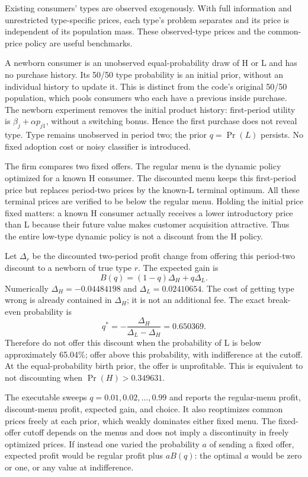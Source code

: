 \documentclass[12pt]{article}
\theoremstyle{definition}
\theoremstyle{remark}
\numberwithin{equation}{section}
\begin{document}
Existing consumers' types are observed exogenously. With full information
and unrestricted type-specific prices, each type's problem separates and its
price is independent of its population mass. These observed-type prices and
the common-price policy are useful benchmarks.

A newborn consumer is an unobserved equal-probability draw of H or L and has no
purchase history. Its 50/50 type probability is an initial prior, without an
individual history to update it. This is distinct from the code's original
50/50 population, which pools consumers who each have a previous inside
purchase. The newborn experiment removes the initial product history: first-period
utility is $\beta_j+\alpha p_{j1}$, without a switching bonus. Hence the first
purchase does not reveal type. Type remains unobserved in period two; the prior
$q=\Pr(L)$ persists. No fixed adoption cost or noisy classifier is introduced.

The firm compares two fixed offers. The regular menu is the dynamic policy
optimized for a known H consumer. The discounted menu keeps this first-period
price but replaces period-two prices by the known-L terminal optimum. All these
terminal prices are verified to be below the regular menu. Holding the initial
price fixed matters: a known H consumer actually receives a lower introductory
price than L because their future value makes customer acquisition attractive.
Thus the entire low-type dynamic policy is not a discount from the H policy.

Let $\Delta_r$ be the discounted two-period profit change from offering this
period-two discount to a newborn of true type $r$. The expected gain is
\[
 B(q)=(1-q)\Delta_H+q\Delta_L.
\]
Numerically $\Delta_H=-0.04484198$ and $\Delta_L=0.02410654$. The cost of
getting type wrong is already contained in $\Delta_H$; it is not an additional
fee. The exact break-even probability is
\[
 q^*=-\frac{\Delta_H}{\Delta_L-\Delta_H}=0.650369.
\]
Therefore do not offer this discount when the probability of L is below
approximately 65.04\%; offer above this probability, with indifference at the
cutoff. At the equal-probability birth prior, the offer is unprofitable.
This is equivalent to not discounting when $\Pr(H)>0.349631$.

The executable sweeps $q=0.01,0.02,\ldots,0.99$ and reports the regular-menu
profit, discount-menu profit, expected gain, and choice. It also reoptimizes
common prices freely at each prior, which weakly dominates either fixed menu.
The fixed-offer cutoff depends on the menus and does not imply a discontinuity
in freely optimized prices. If instead one varied the probability $a$ of
sending a fixed offer, expected profit would be regular profit plus $aB(q)$:
the optimal $a$ would be zero or one, or any value at indifference.
\end{document}
